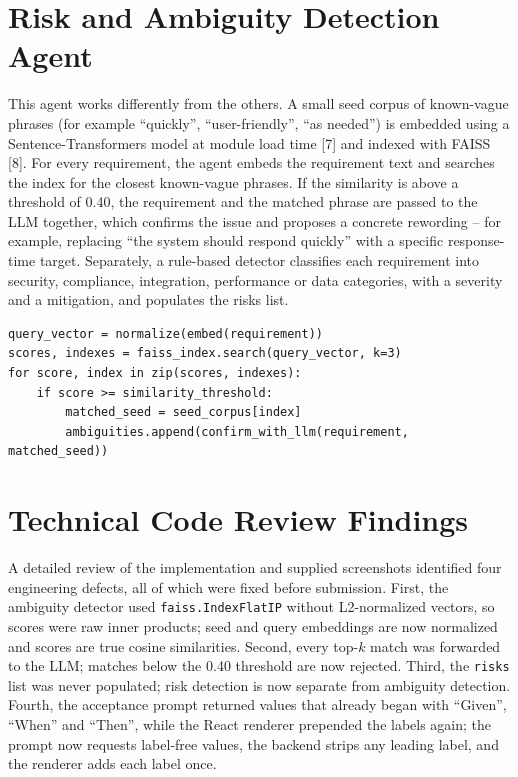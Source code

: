 
\newcommand{\pre}{\vspace{43pt}}
\newcommand{\post}{\vspace{18.4pt}}

\pagestyle{fancy}

\setcounter{page}{8}
\setcounter{chapter}{4}\setcounter{section}{3}\setcounter{table}{0}\setcounter{figure}{0}
\section{Risk and Ambiguity Detection Agent}
\vspace{13.4pt}
This agent works differently from the others. A small seed corpus of
known-vague phrases (for example ``quickly'', ``user-friendly'', ``as
needed'') is embedded using a Sentence-Transformers model at module load
time [7] and indexed with FAISS [8]. For every requirement, the agent
embeds the requirement text and searches the index for the closest
known-vague phrases. If the similarity is above a threshold of 0.40, the
requirement and the matched phrase are passed to the LLM together, which
confirms the issue and proposes a concrete rewording -- for example,
replacing ``the system should respond quickly'' with a specific
response-time target. Separately, a rule-based detector classifies each
requirement into security, compliance, integration, performance or data
categories, with a severity and a mitigation, and populates the risks list.

\vspace{8.6pt}
\begin{lstlisting}
query_vector = normalize(embed(requirement))
scores, indexes = faiss_index.search(query_vector, k=3)
for score, index in zip(scores, indexes):
    if score >= similarity_threshold:
        matched_seed = seed_corpus[index]
        ambiguities.append(confirm_with_llm(requirement, matched_seed))
\end{lstlisting}

\vspace{39.4pt}
\section{Technical Code Review Findings}
\vspace{13.4pt}
A detailed review of the implementation and supplied screenshots
identified four engineering defects, all of which were fixed before
submission. First, the ambiguity detector used \texttt{faiss.IndexFlatIP}
without L2-normalized vectors, so scores were raw inner products; seed and
query embeddings are now normalized and scores are true cosine
similarities. Second, every top-$k$ match was forwarded to the LLM; matches
below the 0.40 threshold are now rejected. Third, the \texttt{risks} list
was never populated; risk detection is now separate from ambiguity
detection. Fourth, the acceptance prompt returned values that already
began with ``Given'', ``When'' and ``Then'', while the React renderer
prepended the labels again; the prompt now requests label-free values, the
backend strips any leading label, and the renderer adds each label once.

